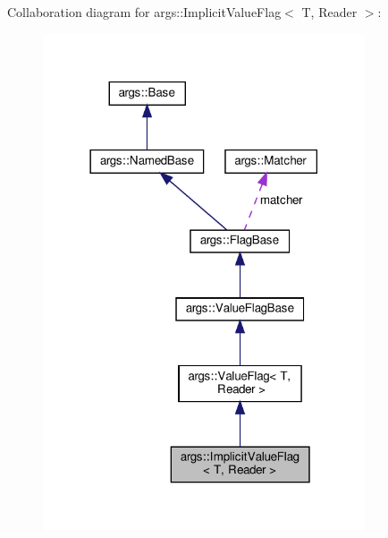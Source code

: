 Collaboration diagram for args\+:\+:Implicit\+Value\+Flag$<$ T, Reader $>$\+:\nopagebreak
\begin{figure}[H]
\begin{center}
\leavevmode
\includegraphics[width=270pt]{classargs_1_1_implicit_value_flag__coll__graph}
\end{center}
\end{figure}
